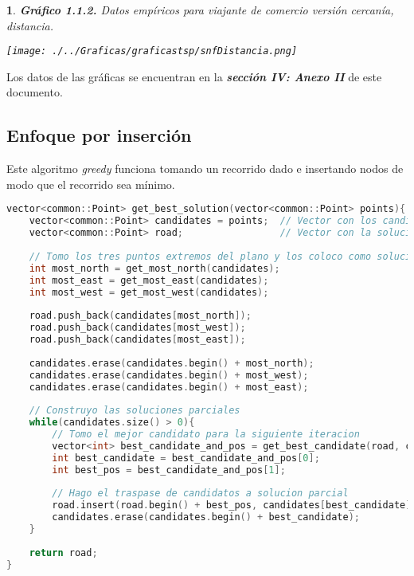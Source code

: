 \documentclass[10pt, a4paper]{article}
\theoremstyle{theorem-style}
\newtheorem*{datos}{}
\theoremstyle{theorem-style}
\theoremstyle{definition-style}
\theoremstyle{remark-style}
\theoremstyle{example-style}
\theoremstyle{definition-style}
\theoremstyle{remark-style}
\begin{document}
\begin{datos}
	{\bf\sffamily Gráfico 1.1.2.} {\sffamily Datos empíricos para viajante de comercio versión cercanía, distancia.}\\
	\vspace{-0.7cm}
	\begin{center}
		\texttt{[image: ./../Graficas/graficastsp/snfDistancia.png]}
	\end{center}	
\end{datos}

Los datos de las gráficas se encuentran en la \textbf{\emph{sección IV: Anexo II}} de este documento.

\subsection{Enfoque por inserción}

Este algoritmo \emph{greedy} funciona tomando un recorrido dado e insertando nodos de modo que el recorrido sea mínimo.

\begin{lstlisting}[language=C]
vector<common::Point> get_best_solution(vector<common::Point> points){
	vector<common::Point> candidates = points;  // Vector con los candidatos
	vector<common::Point> road;                 // Vector con la solucion parcial
	
	// Tomo los tres puntos extremos del plano y los coloco como solucion parcial inicial
	int most_north = get_most_north(candidates);
	int most_east = get_most_east(candidates);
	int most_west = get_most_west(candidates);
	
	road.push_back(candidates[most_north]);
	road.push_back(candidates[most_west]);
	road.push_back(candidates[most_east]);
	
	candidates.erase(candidates.begin() + most_north);
	candidates.erase(candidates.begin() + most_west);
	candidates.erase(candidates.begin() + most_east);
	
	// Construyo las soluciones parciales
	while(candidates.size() > 0){
		// Tomo el mejor candidato para la siguiente iteracion
		vector<int> best_candidate_and_pos = get_best_candidate(road, candidates);
		int best_candidate = best_candidate_and_pos[0];
		int best_pos = best_candidate_and_pos[1];
		
		// Hago el traspase de candidatos a solucion parcial
		road.insert(road.begin() + best_pos, candidates[best_candidate]);
		candidates.erase(candidates.begin() + best_candidate);
	}
	
	return road;
}
\end{lstlisting}
\end{document}
